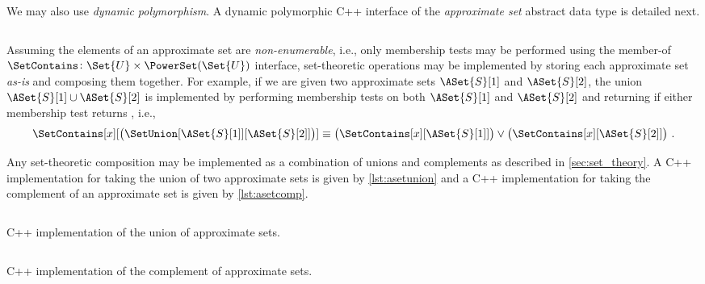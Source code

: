 \documentclass[ ../main.tex]{subfiles}
\begin{document}
We may also use \emph{dynamic polymorphism}. A dynamic polymorphic C++ 
interface of the \emph{approximate set} abstract data type is detailed next.

\inputminted[breaklines,frame=lines,linenos]{c++}{code/random_approximate_sets_adt/include/approximate_set/dynamic/aset.hpp}

Assuming the elements of an approximate set are \emph{non-enumerable}, i.e., only membership tests may be performed using the member-of $\SetContains \colon \Set{U} \times \PowerSet(\Set{U})$ interface, set-theoretic operations may be implemented by storing each approximate set \emph{as-is} and composing them together. For example, if we are given two approximate sets $\ASet{S}[1]$ and $\ASet{S}[2]$, the union $\ASet{S}[1] \cup \ASet{S}[2]$ is implemented by performing membership tests on both $\ASet{S}[1]$ and $\ASet{S}[2]$ and returning \True if either membership test returns \True, i.e.,
\begin{equation}
    \SetContains[x][\left(\SetUnion[\ASet{S}[1]][\ASet{S}[2]]\right)] \equiv \left(\SetContains[x][\ASet{S}[1]]\right) \lor \left(\SetContains[x][\ASet{S}[2]]\right)\,.
\end{equation}

Any set-theoretic composition may be implemented as a combination of unions and complements as described in \cref{sec:set_theory}. A C++ implementation for taking the union of two approximate sets is given by \cref{lst:asetunion} and a C++ implementation for taking the complement of an approximate set is given by \cref{lst:asetcomp}.


\begin{listing}
\inputminted[breaklines]{c++}{code/random_approximate_sets_adt/include/approximate_set/dynamic/aset_union.hpp}
\caption{C++ implementation of the union of approximate sets.}
\label{lst:asetunion}
\end{listing}

\begin{listing}
\inputminted[breaklines]{c++}{code/random_approximate_sets_adt/include/approximate_set/dynamic/aset_complement.hpp}
\caption{C++ implementation of the complement of approximate sets.}
\label{lst:asetcomp}
\end{listing}
\end{document}
